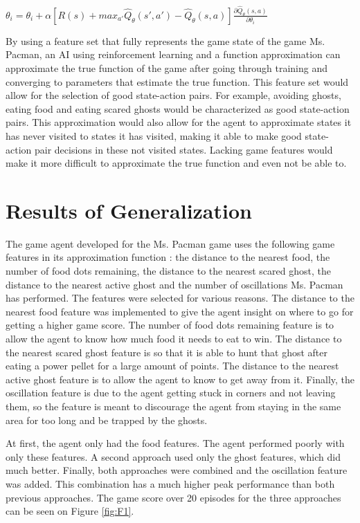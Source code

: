\documentclass[11pt]{scrartcl}
\begin{document}
\begin{center}
$\theta_i = \theta_i + \alpha [R(s) + max_{a'} \hat{Q}_\theta (s',a') - \hat{Q}_\theta (s,a)] \frac{\partial \hat{Q}_\theta (s,a)}{\partial \theta_i}$
\end{center}

By using a feature set that fully represents the game state of the game Ms. Pacman, an AI using reinforcement learning and a function approximation can approximate the true function of the game after going through training and converging to parameters that estimate the true function. This feature set would allow for the selection of good state-action pairs. For example, avoiding ghosts, eating food and eating scared ghosts would be characterized as good state-action pairs. This approximation would also allow for the agent to approximate states it has never visited to states it has visited, making it able to make good state-action pair decisions in these not visited states. Lacking game features would make it more difficult to approximate the true function and even not be able to.

\section{Results of Generalization}

The game agent developed for the Ms. Pacman game uses the following game features in its approximation function : the distance to the nearest food, the number of food dots remaining, the distance to the nearest scared ghost, the distance to the nearest active ghost and the number of oscillations Ms. Pacman has performed. The features were selected for various reasons. The distance to the nearest food feature was implemented to give the agent insight on where to go for getting a higher game score. The number of food dots remaining feature is to allow the agent to know how much food it needs to eat to win. The distance to the nearest scared ghost feature is so that it is able to hunt that ghost after eating a power pellet for a large amount of points. The distance to the nearest active ghost feature is to allow the agent to know to get away from it. Finally, the oscillation feature is due to the agent getting stuck in corners and not leaving them, so the feature is meant to discourage the agent from staying in the same area for too long and be trapped by the ghosts.

At first, the agent only had the food features. The agent performed poorly with only these features. A second approach used only the ghost features, which did much better. Finally, both approaches were combined and the oscillation feature was added. This combination has a much higher peak performance than both previous approaches. The game score over 20 episodes for the three approaches can be seen on Figure \ref{fig:F1}.
\end{document}
